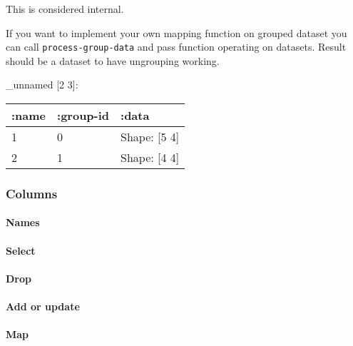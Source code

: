 \documentclass[]{article}
\newenvironment{Shaded}{\begin{snugshade}}{\end{snugshade}}
\newcommand{\KeywordTok}[1]{\textcolor[rgb]{0.13,0.29,0.53}{\textbf{#1}}}
\newcommand{\StringTok}[1]{\textcolor[rgb]{0.31,0.60,0.02}{#1}}
\newcommand{\VariableTok}[1]{\textcolor[rgb]{0.00,0.00,0.00}{#1}}
\newcommand{\AttributeTok}[1]{\textcolor[rgb]{0.77,0.63,0.00}{#1}}
\newcommand{\NormalTok}[1]{#1}
\let\oldparagraph\paragraph
\renewcommand{\paragraph}[1]{\oldparagraph{#1}\mbox{}}
\begin{document}
This is considered internal.

If you want to implement your own mapping function on grouped dataset
you can call \texttt{process-group-data} and pass function operating on
datasets. Result should be a dataset to have ungrouping working.

\begin{Shaded}
\end{Shaded}

\_unnamed {[}2 3{]}:

\begin{longtable}[]{@{}lll@{}}
\toprule
:name & :group-id & :data\tabularnewline
\midrule
\endhead
1 & 0 & Shape: {[}5 4{]}\tabularnewline
2 & 1 & Shape: {[}4 4{]}\tabularnewline
\bottomrule
\end{longtable}

\subsubsection{Columns}\label{columns}

\paragraph{Names}\label{names}

\paragraph{Select}\label{select}

\paragraph{Drop}\label{drop}

\paragraph{Add or update}\label{add-or-update}

\paragraph{Map}\label{map}
\end{document}
